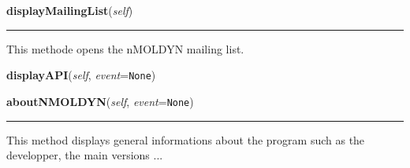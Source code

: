 \hspace{.8\funcindent}\begin{boxedminipage}{\funcwidth}

    \raggedright \textbf{displayMailingList}(\textit{self})

    \vspace{-1.5ex}

    \rule{\textwidth}{0.5\fboxrule}
\setlength{\parskip}{2ex}
    This methode opens the nMOLDYN mailing list.

\setlength{\parskip}{1ex}
    \end{boxedminipage}

    \label{nMOLDYN:GUI:MainDialog:MainDialog:displayAPI}

    \vspace{0.5ex}

\hspace{.8\funcindent}\begin{boxedminipage}{\funcwidth}

    \raggedright \textbf{displayAPI}(\textit{self}, \textit{event}={\tt None})

\setlength{\parskip}{2ex}
\setlength{\parskip}{1ex}
    \end{boxedminipage}

    \label{nMOLDYN:GUI:MainDialog:MainDialog:aboutNMOLDYN}

    \vspace{0.5ex}

\hspace{.8\funcindent}\begin{boxedminipage}{\funcwidth}

    \raggedright \textbf{aboutNMOLDYN}(\textit{self}, \textit{event}={\tt None})

    \vspace{-1.5ex}

    \rule{\textwidth}{0.5\fboxrule}
\setlength{\parskip}{2ex}
    This method displays general informations about the program such as the
    developper, the main versions ...

\setlength{\parskip}{1ex}
    \end{boxedminipage}


